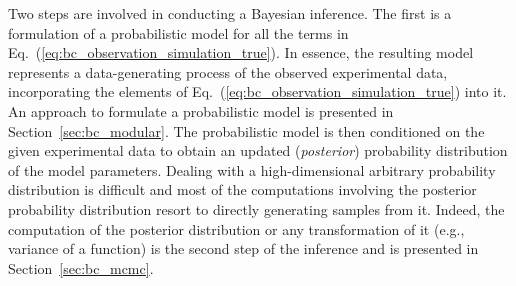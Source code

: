 Two steps are involved in conducting a Bayesian inference.
The first is a formulation of a probabilistic model for all the terms in Eq.~(\ref{eq:bc_observation_simulation_true}).
In essence, the resulting model represents a data-generating process of the observed experimental data,
incorporating the elements of Eq.~(\ref{eq:bc_observation_simulation_true}) into it.
An approach to formulate a probabilistic model is presented in Section~\ref{sec:bc_modular}.
The probabilistic model is then conditioned on the given experimental data to obtain an updated (\emph{posterior}) probability distribution of the model parameters.
Dealing with a high-dimensional arbitrary probability distribution is difficult and most of the computations involving the posterior probability distribution resort to directly generating samples from it. 
Indeed, the computation of the posterior distribution or any transformation of it (e.g., variance of a function) is the second step of the inference and is presented in Section~\ref{sec:bc_mcmc}.

